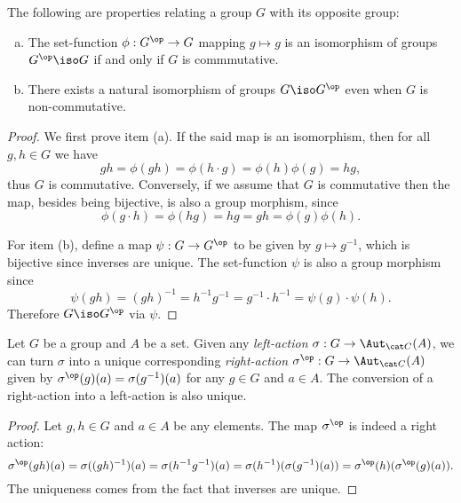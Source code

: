 \begin{corollary}
\label{cor:Gop-iso-G-id-iff-commutative}
The following are properties relating a group \(G\) with its opposite group:
\begin{enumerate}[(a)]\setlength\itemsep{0em}
\item The set-function \(\phi: G^{\op} \to G\) mapping \(g \mapsto g\) is an
  isomorphism of groups \(G^{\op} \iso G\) if and only if \(G\) is commmutative.

\item There exists a natural isomorphism of groups \(G \iso G^{\op}\) even when
  \(G\) is non-commutative.
\end{enumerate}
\end{corollary}

\begin{proof}
We first prove item (a). If the said map is an isomorphism, then for all
\(g, h \in G\) we have
\[
g h = \phi(g h) = \phi(h \cdot g) = \phi(h) \phi(g) = h g,
\]
thus \(G\) is commutative. Conversely, if we assume that \(G\) is commutative
then the map, besides being bijective, is also a group morphism, since
\[
\phi(g \cdot h) = \phi(h g) = h g = g h = \phi(g) \phi(h).
\]

For item (b), define a map \(\psi: G \to G^{\op}\) to be given by
\(g \mapsto g^{-1}\), which is bijective since inverses are unique. The
set-function \(\psi\) is also a group morphism since
\[
\psi(g h) = (g h)^{-1} = h^{-1} g^{-1}
= g^{-1} \cdot h^{-1} = \psi(g) \cdot \psi(h).
\]
Therefore \(G \iso G^{\op}\) via \(\psi\).
\end{proof}

\begin{proposition}
\label{prop:left-and-right-actions}
Let \(G\) be a group and \(A\) be a set. Given any \emph{left-action}
\(\sigma: G \to \Aut_{\cat C}(A)\), we can turn \(\sigma\) into a unique
corresponding \emph{right-action} \(\sigma^{\op}: G \to \Aut_{\cat C}(A)\) given
by \(\sigma^{\op}(g)(a) = \sigma(g^{-1})(a)\) for any \(g \in G\) and
\(a \in A\). The conversion of a right-action into a left-action is also unique.
\end{proposition}

\begin{proof}
Let \(g, h \in G\) and \(a \in A\) be any elements. The map \(\sigma^{\op}\) is
indeed a right action:
\[
\sigma^{\op}(g h)(a)
= \sigma((gh)^{-1})(a)
= \sigma(h^{-1} g^{-1})(a)
= \sigma(h^{-1})(\sigma(g^{-1})(a))
= \sigma^{\op}(h)(\sigma^{\op}(g)(a)).
\]
The uniqueness comes from the fact that inverses are unique.
\end{proof}

